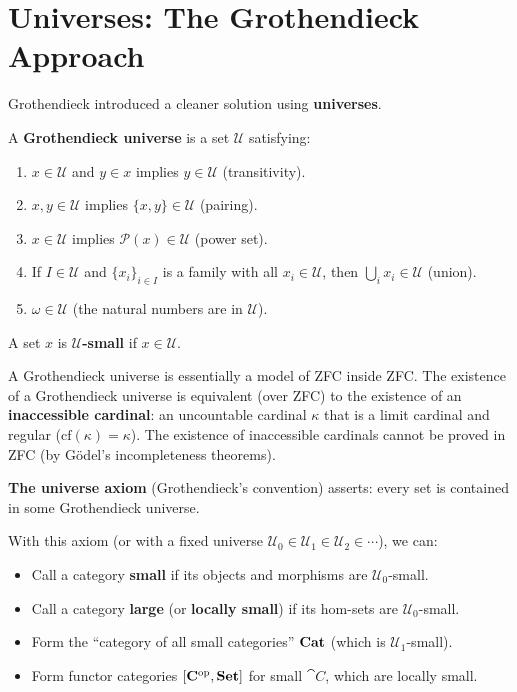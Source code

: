 \section{Universes: The Grothendieck Approach}

Grothendieck introduced a cleaner solution using \textbf{universes}.

\begin{definition}
A \textbf{Grothendieck universe} is a set $\mathcal{U}$ satisfying:
\begin{enumerate}
  \item $x \in \mathcal{U}$ and $y \in x$ implies $y \in \mathcal{U}$ (transitivity).
  \item $x, y \in \mathcal{U}$ implies $\{x,y\} \in \mathcal{U}$ (pairing).
  \item $x \in \mathcal{U}$ implies $\mathcal{P}(x) \in \mathcal{U}$ (power set).
  \item If $I \in \mathcal{U}$ and $\{x_i\}_{i \in I}$ is a family with all $x_i \in \mathcal{U}$, then $\bigcup_i x_i \in \mathcal{U}$ (union).
  \item $\omega \in \mathcal{U}$ (the natural numbers are in $\mathcal{U}$).
\end{enumerate}
A set $x$ is \textbf{$\mathcal{U}$-small} if $x \in \mathcal{U}$.
\end{definition}

\begin{remark}
A Grothendieck universe is essentially a model of ZFC inside ZFC. The existence of a Grothendieck universe is equivalent (over ZFC) to the existence of an \textbf{inaccessible cardinal}: an uncountable cardinal $\kappa$ that is a limit cardinal and regular ($\text{cf}(\kappa) = \kappa$). The existence of inaccessible cardinals cannot be proved in ZFC (by Gödel's incompleteness theorems).
\end{remark}

\textbf{The universe axiom} (Grothendieck's convention) asserts: every set is contained in some Grothendieck universe.

With this axiom (or with a fixed universe $\mathcal{U}_0 \in \mathcal{U}_1 \in \mathcal{U}_2 \in \cdots$), we can:
\begin{itemize}
  \item Call a category \textbf{small} if its objects and morphisms are $\mathcal{U}_0$-small.
  \item Call a category \textbf{large} (or \textbf{locally small}) if its hom-sets are $\mathcal{U}_0$-small.
  \item Form the ``category of all small categories'' $\mathbf{Cat}$ (which is $\mathcal{U}_1$-small).
  \item Form functor categories $[\mathbf{C}^{\mathrm{op}}, \mathbf{Set}]$ for small $\cat{C}$, which are locally small.
\end{itemize}


